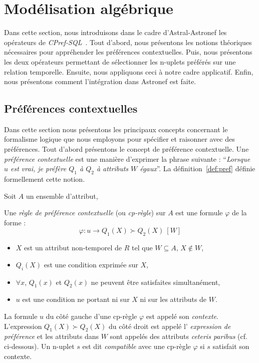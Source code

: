 \section{Modélisation algébrique}\label{sec:ext:prefs:algebre}
Dans cette section, nous introduisons dans le cadre d'Astral-Astronef les opérateurs de \textit{CPref-SQL}~\cite{DeAmo:cprefsql}. Tout d'abord, nous présentons les notions théoriques nécessaires pour appréhender les préférences contextuelles. Puis, nous présentons les deux opérateurs permettant de sélectionner les n-uplets préférés sur une relation temporelle. Ensuite, nous appliquons ceci à notre cadre applicatif. Enfin, nous présentons comment l'intégration dans Astronef est faite.

\subsection{Préférences contextuelles}
Dans cette section nous présentons les principaux concepts concernant le formalisme logique que nous employons pour spécifier et raisonner avec des préférences. Tout d'abord présentons le concept de préférence contextuelle. Une \textit{préférence contextuelle} est une manière d'exprimer la phrase suivante : \enquote{\it Lorsque $u$ est vrai, je préfère $Q_1$ à $Q_2$ à attributs $W$ égaux}. La définition~\ref{def:pref} définie formellement cette notion.

\begin{defi}\label{def:pref}
Soit $A$ un ensemble d'attribut,

Une \textit{règle de préférence contextuelle} (ou \textit{cp-règle}) sur $A$ est une formule $\varphi$ de la forme :
 $$\varphi: u \rightarrow Q_1(X) \succ Q_2(X)\ [W]$$
\begin{itemize}
	\item $X$ est un attribut non-temporel de $R$ tel que $W \subseteq A$, $X \not \in W$,
	\item $Q_i(X)$ est une condition exprimée sur $X$,
	\item $\forall x$, $Q_1(x)$ et $Q_2(x)$ ne peuvent être satisfaites simultanément,
	\item $u$ est une condition ne portant ni sur $X$ ni sur les attributs de $W$.
	\end{itemize}
\end{defi}

La formule $u$ du côté gauche d'une cp-règle $\varphi$ est appelé son \textit{contexte}. L'expression $Q_1(X) \succ Q_2(X)$ du côté droit est appelé l' \textit{expression de préférence} et les attributs dans $W$ sont appelés des attributs \textit{ceteris paribus} (cf. ci-dessous). Un n-uplet $s$ est dit \textit{compatible} avec une cp-règle $\varphi$ si $s$ satisfait son contexte.

